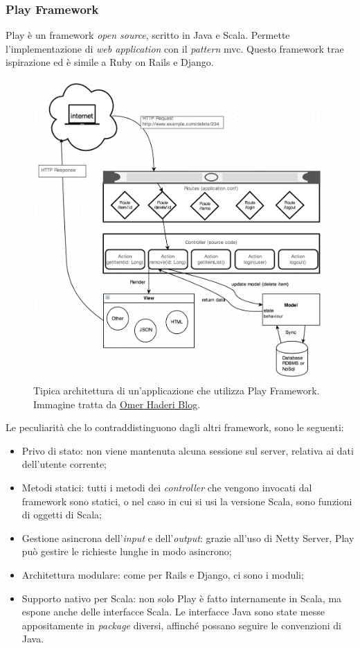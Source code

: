 \subsubsection{Play Framework}
Play è un \gls{framework} \emph{open source}, scritto in Java e Scala. Permette l'implementazione di \emph{web application} con il \emph{pattern} \gls{mvc}. Questo \gls{framework} trae ispirazione ed è simile a Ruby on Rails e Django.
\begin{figure}[ht]
\centering
\includegraphics[scale=0.5]{immagini/play-arch}
\caption{Tipica architettura di un'applicazione che utilizza Play Framework. Immagine tratta da \href{https://110j.wordpress.com/2013/10/23/play-framework-2-1-architecture/}{Omer Haderi Blog}.}
\label{fig:play-app}
\end{figure}
\newpage
Le peculiarità che lo contraddistinguono dagli altri \gls{framework}, sono le seguenti:
\begin{itemize}
\item Privo di stato: non viene mantenuta alcuna sessione sul server, relativa ai dati dell'utente corrente;
\item Metodi statici: tutti i metodi dei \emph{controller} che vengono invocati dal \gls{framework} sono statici, o nel caso in cui si usi la versione Scala, sono funzioni di oggetti di Scala;
\item Gestione asincrona dell'\emph{input} e dell'\emph{output}: grazie all'uso di Netty Server, Play può gestire le richieste lunghe in modo asincrono;
\item Architettura modulare: come per Rails e Django, ci sono i moduli;
\item Supporto nativo per Scala: non solo Play è fatto internamente in Scala, ma espone anche delle interfacce Scala. Le interfacce Java sono state messe appositamente in \emph{package} diversi, affinché possano seguire le convenzioni di Java.
\end{itemize}
